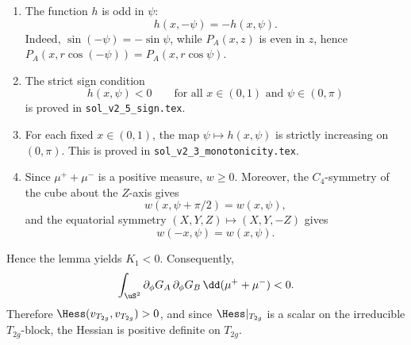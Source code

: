 \begin{enumerate}
\item The function \(h\) is odd in \(\psi\):
\[
h(x,-\psi)=-h(x,\psi).
\]
Indeed, \(\sin(-\psi)=-\sin\psi\), while \(P_A(x,z)\) is even in \(z\), hence \(P_A(x,r\cos(-\psi))=P_A(x,r\cos\psi)\).

\item The strict sign condition
\[
h(x,\psi)<0
\qquad
\text{for all }x\in(0,1)\text{ and }\psi\in(0,\pi)
\]
is proved in \texttt{sol\_v2\_5\_sign.tex}.

\item For each fixed \(x\in(0,1)\), the map \(\psi\mapsto h(x,\psi)\) is strictly increasing on \((0,\pi)\). This is proved in \texttt{sol\_v2\_3\_monotonicity.tex}.

\item Since \(\mu^++\mu^-\) is a positive measure, \(w\geq 0\). Moreover, the \(C_4\)-symmetry of the cube about the \(Z\)-axis gives
\[
w(x,\psi+\pi/2)=w(x,\psi),
\]
and the equatorial symmetry \((X,Y,Z)\mapsto(X,Y,-Z)\) gives
\[
w(-x,\psi)=w(x,\psi).
\]
\end{enumerate}

Hence the lemma yields \(K_1<0\). Consequently,
\[
\int_{\uS^2}\partial_\phi G_A\,\partial_\phi G_B\,\dd(\mu^++\mu^-)<0.
\]
Therefore \(\Hess(v_{T_{2g}},v_{T_{2g}})>0\), and since \(\Hess|_{T_{2g}}\) is a scalar on the irreducible \(T_{2g}\)-block, the Hessian is positive definite on \(T_{2g}\).
